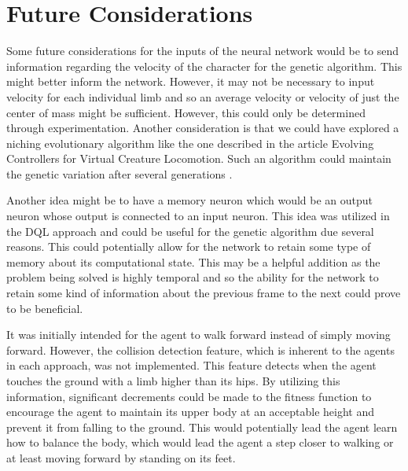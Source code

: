 \documentclass[letterpaper]{article} %
\begin{document}
\section{Future Considerations}

Some future considerations for the inputs of the neural network would be to send information regarding the velocity of the character for the genetic algorithm. This might better inform the network. However, it may not be necessary to input velocity for each individual limb and so an average velocity or velocity of just the center of mass might be sufficient. However, this could only be determined through experimentation. Another consideration is that we could have explored a niching evolutionary algorithm like the one described in the article Evolving Controllers for Virtual Creature Locomotion. Such an algorithm could maintain the genetic variation after several generations \cite{sanders_lobb_riddle_2003}.  

\par Another idea might be to have a memory neuron which would be an output neuron whose output is connected to an input neuron. This idea was utilized in the DQL approach and could be useful for the genetic algorithm due several reasons. This could potentially allow for the network to retain some type of memory about its computational state. This may be a helpful addition as the problem being solved is highly temporal and so the ability for the network to retain some kind of information about the previous frame to the next could prove to be beneficial. 

\par It was initially intended for the agent to walk forward instead of simply moving forward. However, the collision detection feature, which is inherent to the agents in each approach, was not implemented. This feature detects when the agent touches the ground with a limb higher than its hips. By utilizing this information, significant decrements could be made to the fitness function to encourage the agent to maintain its upper body at an acceptable height and prevent it from falling to the ground. This would potentially lead the agent learn how to balance the body, which would lead the agent a step closer to walking or at least moving forward by standing on its feet.


\end{document}
